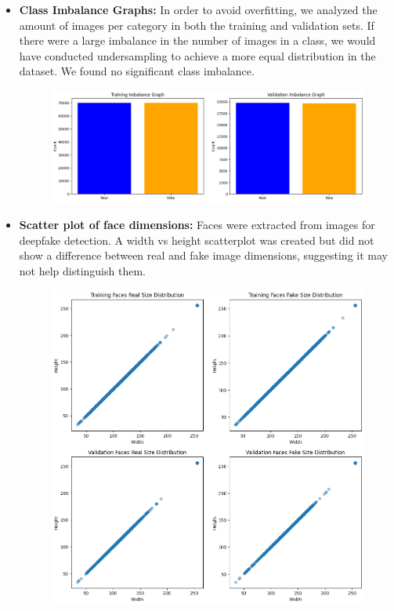 \documentclass[10pt,twocolumn,letterpaper]{article}
\begin{document}
\begin{itemize}
    \item \textbf{Class Imbalance Graphs:} In order to avoid overfitting, we analyzed the amount of images per category in both the training and validation sets. If there were a large imbalance in the number of images in a class, we would have conducted undersampling to achieve a more equal distribution in the dataset. 
    We found no significant class imbalance.
    \begin{figure}[H]
    \centering
    \includegraphics[scale=0.2]{2.png}
    \end{figure}
    \item \textbf{Scatter plot of face dimensions:} Faces were extracted from images for deepfake detection. A width vs height scatterplot was created but did not show a difference between real and fake image dimensions, suggesting it may not help distinguish them.
    \begin{figure}[H]
    \centering
    \includegraphics[scale=0.2]{3.png}
    \end{figure}
    

\end{itemize}
\end{document}
